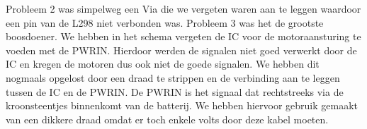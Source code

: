 Probleem 2 was simpelweg een Via die we vergeten waren aan te leggen waardoor een pin van de L298 niet verbonden was. 
Probleem 3 was het de grootste boosdoener. We hebben in het schema vergeten de IC voor de motoraansturing te voeden met de PWRIN. Hierdoor werden de signalen niet goed verwerkt door de IC en kregen de motoren dus ook niet de goede signalen. We hebben dit nogmaals opgelost door een draad te strippen en de verbinding aan te leggen tussen de IC en de PWRIN. De PWRIN is het signaal dat rechtstreeks via de kroonsteentjes binnenkomt van de batterij. We hebben hiervoor gebruik gemaakt van een dikkere draad omdat er toch enkele volts door deze kabel moeten. 




